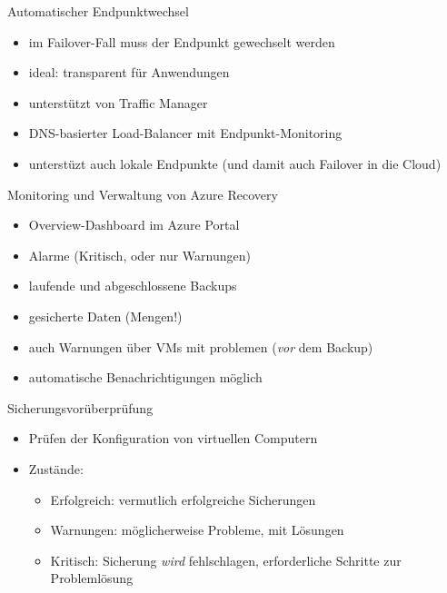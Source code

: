 \begin{flashcard}[Definition]{Automatischer Endpunktwechsel}
  \begin{itemize}
    \item im Failover-Fall muss der Endpunkt gewechselt werden
    \item ideal: transparent für Anwendungen
    \item unterstützt von Traffic Manager
    \item DNS-basierter Load-Balancer mit Endpunkt-Monitoring
    \item unterstüzt auch lokale Endpunkte\newline
    (und damit auch Failover in die Cloud)
  \end{itemize}
\end{flashcard}


\begin{flashcard}[Definition]{Monitoring und Verwaltung von Azure Recovery}
  \begin{itemize}
    \item Overview-Dashboard im Azure Portal
    \item Alarme (Kritisch, oder nur Warnungen)
    \item laufende und abgeschlossene Backups
    \item gesicherte Daten (Mengen!)
    \item auch Warnungen über VMs mit problemen (\emph{vor} dem Backup)
    \item automatische Benachrichtigungen möglich
  \end{itemize}
\end{flashcard}

\begin{flashcard}[Definition]{Sicherungsvorüberprüfung}
  \begin{itemize}
    \item Prüfen der Konfiguration von virtuellen Computern
    \item Zustände:
      \begin{itemize}
        \item Erfolgreich: vermutlich erfolgreiche Sicherungen
        \item Warnungen: möglicherweise Probleme, mit Lösungen
        \item Kritisch: Sicherung \emph{wird} fehlschlagen, erforderliche Schritte zur Problemlösung
      \end{itemize}
  \end{itemize}
\end{flashcard}

